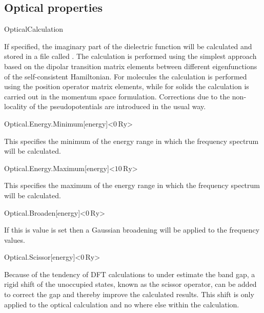 \subsection{Optical properties}

\begin{fdflogicalF}{OpticalCalculation}

  If specified, the imaginary part of the dielectric function will be
  calculated and stored in a file called . The
  calculation is performed using the simplest approach based on the
  dipolar transition matrix elements between different eigenfunctions
  of the self-consistent Hamiltonian. For molecules the calculation is
  performed using the position operator matrix elements, while for
  solids the calculation is carried out in the momentum space
  formulation. Corrections due to the non-locality of the
  pseudopotentials are introduced in the usual way.

\end{fdflogicalF}

\begin{fdfentry}{Optical.Energy.Minimum}[energy]<$0\,\mathrm{Ry}$>

  This specifies the minimum of the energy range in which the
  frequency spectrum will be calculated.

\end{fdfentry}

\begin{fdfentry}{Optical.Energy.Maximum}[energy]<$10\,\mathrm{Ry}$>

  This specifies the maximum of the energy range in which the
  frequency spectrum will be calculated.

\end{fdfentry}

\begin{fdfentry}{Optical.Broaden}[energy]<$0\,\mathrm{Ry}$>

  If this is value is set then a Gaussian broadening will be applied
  to the frequency values.

\end{fdfentry}

\begin{fdfentry}{Optical.Scissor}[energy]<$0\,\mathrm{Ry}$>

  Because of the tendency of DFT calculations to under estimate the
  band gap, a rigid shift of the unoccupied states, known as the
  scissor operator, can be added to correct the gap and thereby
  improve the calculated results. This shift is only applied to the
  optical calculation and no where else within the calculation.

\end{fdfentry}

